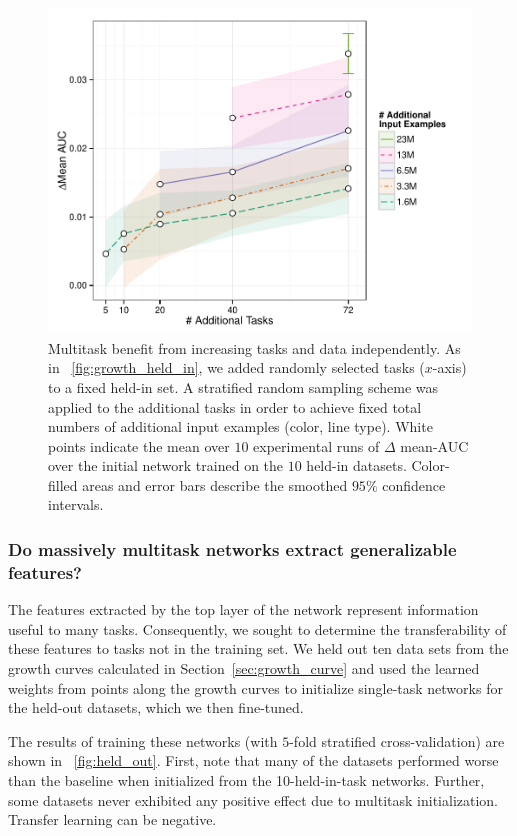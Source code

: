 \begin{figure}[ht]
\centering
\includegraphics[width=\linewidth]{Images/grid_final.pdf}
\caption{Multitask benefit from increasing tasks and data independently.
  As in \figurename~\ref{fig:growth_held_in}, we added randomly selected
  tasks ($x$-axis) to a fixed held-in set. A stratified random sampling
  scheme was applied to the additional tasks in order to achieve fixed
  total numbers of additional input examples (color, line type).  White
  points indicate the mean over $10$ experimental runs of $\Delta$ mean-AUC
  over the initial network trained on the $10$ held-in datasets. Color-filled
  areas and error bars describe the smoothed $95\%$ confidence intervals.}
\label{fig:data_tasks}
\end{figure}

\subsubsection{Do massively multitask networks extract generalizable features?}
\label{sec:embedding}

The features extracted by the top layer of the network represent
information useful to many tasks. Consequently, we sought to determine the
transferability of these features to tasks not in the training set.  We
held out ten data sets from the growth curves calculated in
Section~\ref{sec:growth_curve} and used the learned weights from points
along the growth curves to initialize single-task networks for the held-out
datasets, which we then fine-tuned.

The results of training these networks (with $5$-fold stratified
cross-validation) are shown in \figurename~\ref{fig:held_out}. First, note
that many of the datasets performed worse than the baseline when
initialized from the 10-held-in-task networks. Further, some datasets never
exhibited any positive effect due to multitask initialization. Transfer
learning can be negative.

